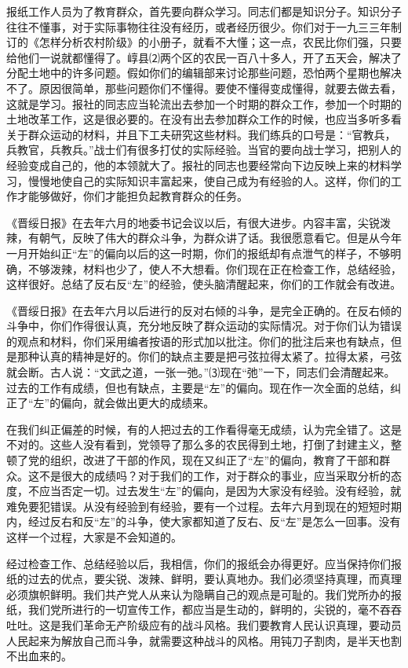 \documentclass[UTF-8, a5paper, 12pt]{ctexart}
\begin{document}
报纸工作人员为了教育群众，首先要向群众学习。同志们都是知识分子。知识分子往往不懂事，对于实际事物往往没有经历，或者经历很少。你们对于一九三三年制订的《怎样分析农村阶级》的小册子，就看不大懂；这一点，农民比你们强，只要给他们一说就都懂得了。崞县⑵两个区的农民一百八十多人，开了五天会，解决了分配土地中的许多问题。假如你们的编辑部来讨论那些问题，恐怕两个星期也解决不了。原因很简单，那些问题你们不懂得。要使不懂得变成懂得，就要去做去看，这就是学习。报社的同志应当轮流出去参加一个时期的群众工作，参加一个时期的土地改革工作，这是很必要的。在没有出去参加群众工作的时候，也应当多听多看关于群众运动的材料，并且下工夫研究这些材料。我们练兵的口号是：“官教兵，兵教官，兵教兵。”战士们有很多打仗的实际经验。当官的要向战士学习，把别人的经验变成自己的，他的本领就大了。报社的同志也要经常向下边反映上来的材料学习，慢慢地使自己的实际知识丰富起来，使自己成为有经验的人。这样，你们的工作才能够做好，你们才能担负起教育群众的任务。

《晋绥日报》在去年六月的地委书记会议以后，有很大进步。内容丰富，尖锐泼辣，有朝气，反映了伟大的群众斗争，为群众讲了话。我很愿意看它。但是从今年一月开始纠正“左”的偏向以后的这一时期，你们的报纸却有点泄气的样子，不够明确，不够泼辣，材料也少了，使人不大想看。你们现在正在检查工作，总结经验，这样很好。总结了反右反“左”的经验，使头脑清醒起来，你们的工作就会有改进。

《晋绥日报》在去年六月以后进行的反对右倾的斗争，是完全正确的。在反右倾的斗争中，你们作得很认真，充分地反映了群众运动的实际情况。对于你们认为错误的观点和材料，你们采用编者按语的形式加以批注。你们的批注后来也有缺点，但是那种认真的精神是好的。你们的缺点主要是把弓弦拉得太紧了。拉得太紧，弓弦就会断。古人说：“文武之道，一张一弛。”⑶现在“弛”一下，同志们会清醒起来。过去的工作有成绩，但也有缺点，主要是“左”的偏向。现在作一次全面的总结，纠正了“左”的偏向，就会做出更大的成绩来。

在我们纠正偏差的时候，有的人把过去的工作看得毫无成绩，认为完全错了。这是不对的。这些人没有看到，党领导了那么多的农民得到土地，打倒了封建主义，整顿了党的组织，改进了干部的作风，现在又纠正了“左”的偏向，教育了干部和群众。这不是很大的成绩吗？对于我们的工作，对于群众的事业，应当采取分析的态度，不应当否定一切。过去发生“左”的偏向，是因为大家没有经验。没有经验，就难免要犯错误。从没有经验到有经验，要有一个过程。去年六月到现在的短短时期内，经过反右和反“左”的斗争，使大家都知道了反右、反“左”是怎么一回事。没有这样一个过程，大家是不会知道的。

经过检查工作、总结经验以后，我相信，你们的报纸会办得更好。应当保持你们报纸的过去的优点，要尖锐、泼辣、鲜明，要认真地办。我们必须坚持真理，而真理必须旗帜鲜明。我们共产党人从来认为隐瞒自己的观点是可耻的。我们党所办的报纸，我们党所进行的一切宣传工作，都应当是生动的，鲜明的，尖锐的，毫不吞吞吐吐。这是我们革命无产阶级应有的战斗风格。我们要教育人民认识真理，要动员人民起来为解放自己而斗争，就需要这种战斗的风格。用钝刀子割肉，是半天也割不出血来的。
\end{document}
